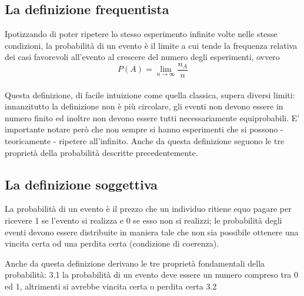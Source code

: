 \documentclass[a4paper]{article}
\begin{document}
\subsection{La definizione frequentista}
Ipotizzando di poter ripetere lo stesso esperimento infinite volte nelle stesse condizioni, la probabilit\`{a} di un evento \`{e} il limite a cui tende la frequenza relativa dei casi favorevoli all'evento al crescere del numero degli esperimenti, ovvero
\\
\[
 P(A)= \lim_{n \to \infty} \frac{n_A}{n}
\]
\\
Questa definizione, di facile intuizione come quella classica, supera diversi limiti: innanzitutto la definizione non \`{e} più circolare, gli eventi non devono essere in numero finito ed inoltre non devono essere tutti necessariamente equiprobabili.
E' importante notare però che non sempre si hanno esperimenti che si possono - teoricamente - ripetere all'infinito.
Anche da questa definizione seguono le tre propriet\`{a} della probabilit\`{a} descritte precedentemente.

\subsection{La definizione soggettiva}
La probabilit\`{a} di un evento \`{e} il prezzo che un individuo ritiene equo pagare per ricevere 1 se l'evento si realizza e 0 se esso non si realizzi; le probabilit\`{a} degli eventi devono essere distribuite in maniera tale che non sia possibile ottenere una vincita certa od una perdita certa (condizione di coerenza).

Anche da questa definizione derivano le tre propriet\`{a} fondamentali della probabilit\`{a}:
3.1 la probabilit\`{a} di un evento deve essere un numero compreso tra 0 ed 1, altrimenti si avrebbe vincita certa o perdita certa
3.2 
\end{document}
